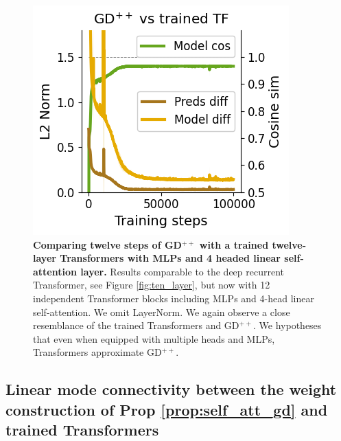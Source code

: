 \documentclass{article}
\theoremstyle{plain}
\theoremstyle{definition}
\theoremstyle{remark}
\begin{document}
\begin{figure}
\begin{center}
\begin{minipage}{.30\textwidth}
\begin{center}
  \end{center}
  \vspace{-10pt}
\end{minipage}
\begin{minipage}{.30\textwidth}
  \centering
  \begin{center}
    \includegraphics[width=1.\textwidth]{Final_figures/linear/twelve_layers/sim2_12.png}
  \end{center}
  \vspace{-10pt}
\end{minipage}
\end{center}
\vspace{-3pt}
  \caption{\textbf{Comparing twelve steps of GD$^{++}$ with a trained twelve-layer Transformers with MLPs and 4 headed linear self-attention layer.} Results comparable to the deep recurrent Transformer, see Figure \ref{fig:ten_layer}, but now with 12 independent Transformer blocks including MLPs and 4-head linear self-attention. We omit LayerNorm. We again observe a close resemblance of the trained Transformers and GD$^{++}$. We hypotheses that even when equipped with multiple heads and MLPs, Transformers approximate GD$^{++}$.}
  \label{fig:twelve_layer}
\end{figure}

\subsection{Linear mode connectivity between the weight construction of Prop \ref{prop:self_att_gd} and trained Transformers }
\label{app:mode_connect}
\end{document}
